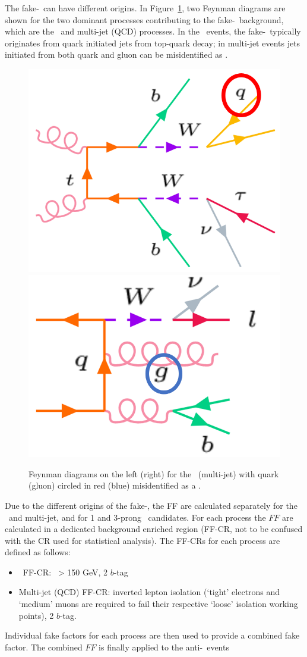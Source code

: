 The fake-\tauhad\ can have different origins. 
In Figure~\ref{fig:fakes:feynman}, two Feynman diagrams are shown
for the two dominant processes contributing to the fake-\tauhad\ background,
which are the \ttbar\ and multi-jet (QCD) processes. 
In the \ttbar\ events, the fake-\tauhad\ typically originates from quark initiated jets from 
top-quark decay; in multi-jet events jets initiated from both quark and gluon can be
misidentified as \tauhad. 
\begin{figure}[htbp]
\centering
\includegraphics[width=.33\textwidth]{DiHiggs/plots/feynman_ttbarfakes.png} \hspace{2cm}
\includegraphics[width=.33\textwidth]{DiHiggs/plots/feynman_QCDfakes.png}
\caption{
Feynman diagrams on the left (right) for the \ttbar\ (multi-jet) with quark (gluon) circled in
red (blue) misidentified as a \tauhad. 
}
\label{fig:fakes:feynman}
\end{figure} 
Due to the different origins of the fake-\tauhad, the FF are
calculated separately for the \ttbar\ and multi-jet, and for 1 and 3-prong \tauhad\ candidates.
For each process the $FF$ are calculated in a dedicated background enriched region (FF-CR,
not to be confused with the CR used for statistical analysis). 
The FF-CRs for each process are defined as follows:
\begin{itemize}
\item \ttbar\ FF-CR: \mbb\ > 150 GeV, 2 $b$-tag 
\item Multi-jet (QCD) FF-CR: inverted lepton isolation 
	(`tight' electrons and `medium' muons are 
	required to fail their respective `loose' isolation working points), 
	2 $b$-tag. 
\end{itemize}
Individual fake factors for each process
are then used to provide a combined fake factor. 
The combined $FF$ is finally applied to the anti-\tauhad\ events 
